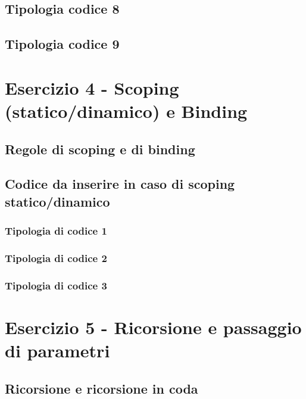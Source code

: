 \documentclass[a4paper]{article}
\begin{document}
	\subsection{Tipologia codice 8}
	
	
	\subsection{Tipologia codice 9}
	
	
	\section{Esercizio 4 - Scoping (statico/dinamico) e Binding}
	
	\subsection{Regole di scoping e di binding}
	
	\subsection{Codice da inserire in caso di scoping statico/dinamico}
	
	\subsubsection{Tipologia di codice 1}
	
	\subsubsection{Tipologia di codice 2}
	
	\subsubsection{Tipologia di codice 3}
	
	\section{Esercizio 5 - Ricorsione e passaggio di parametri}
	
	\subsection{Ricorsione e ricorsione in coda}
	
\end{document}

